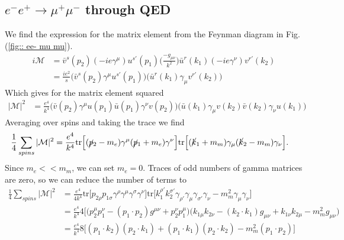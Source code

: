 \documentclass[11pt]{article}
\begin{document}
\subsection{$e^- e^+ \rightarrow \mu^+ \mu^-$ through QED}
\begin{flushleft}
We find the expression for the matrix element from the Feynman diagram in Fig. (\ref{fig:: ee- mu mu}).
\begin{align*}
i \mathcal{M} &= \bar{v}^s (p_2) (-ie \gamma^{\mu}) u^{s'} (p_1) \big( \frac{-g_{\mu \nu}}{k^2} \big) \bar{u}^r(k_1) (-ie \gamma^{\nu})v^{r'}(k_2)\\
&= \frac{i e^2}{s} \Big( \bar{v}^s (p_2) \gamma^{\mu} u^{s'} (p_1) \Big) \Big( \bar{u}^r(k_1) \gamma_{\mu}v^{r'}(k_2) \Big)
\end{align*}
Which gives for the matrix element squared
\begin{align*}
|\mathcal{M}|^2 &= \frac{e^4}{k^4} \Big( \bar{v} (p_2) \gamma^{\mu} u (p_1) \bar{u}(p_1) \gamma^{\nu} v(p_2) \Big) \Big(\bar{u} (k_1) \gamma_{\mu} v(k_2) \bar{v} (k_2) \gamma_{\nu} u(k_1) \Big)
\end{align*}
Averaging over spins and taking the trace we find
\begin{align*}
\frac{1}{4} \sum_{spins} |\mathcal{M}|^2 &= \frac{e^4}{k^4} \text{tr} \Big[ (\cancel{p}_2 - m_e) \gamma^{\mu} (\cancel{p}_1 + m_e) \gamma^{\nu}\Big] \text{tr} \Big[(\cancel{k}_1 + m_m) \gamma_{\mu} (\cancel{k}_2 - m_m) \gamma_{\nu} \Big].
\end{align*}
Since $m_e<<m_m$, we can set $m_e = 0$. Traces of odd numbers of gamma matrices are zero, so we can reduce the number of terms to
\begin{align*}
\frac{1}{4} \sum_{spins} |\mathcal{M}|^2 &= \frac{e^4}{4 k^4} \text{tr} \Big[ p_{2 \rho} p_{1 \sigma} \gamma^{\rho}\gamma^{\mu} \gamma^{\sigma} \gamma^{\nu}\Big] \text{tr} \Big[k_1^{\rho'} k_2^{\sigma'}\gamma_{\rho'}\gamma_{\mu} \gamma_{\sigma'} \gamma_{\nu} -m_m^2 \gamma_{\mu} \gamma_{\nu} \Big]\\
&= \frac{e^4}{k^4} 4 \Bigg[ \Big(
p_2^{\mu}p_1^{\nu} - (p_1 \cdot p_2)g^{\mu \nu} + p_2^{\nu} p_1^{\mu}
\Big) \Big(k_{1\mu}k_{2\nu} - (k_2 \cdot k_1)g_{\mu \nu} + k_{1 \nu} k_{2 \mu} -m_m^2 g_{\mu \nu} \Big)\\
&= \frac{e^4}{k^4} 8 \Bigg[ (p_1 \cdot k_2)(p_2 \cdot k_1) 
 + (p_1 \cdot k_1)(p_2 \cdot k_2) -m_m^2 (p_1 \cdot p_2)\Bigg]\\
\end{align*}
\end{flushleft}
\end{document}
